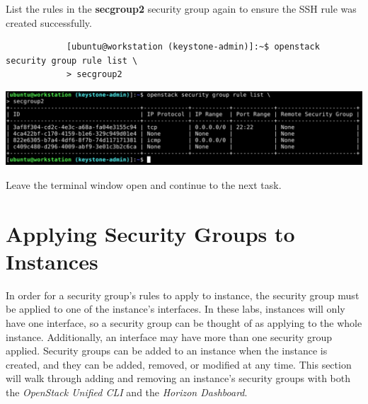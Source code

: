 \documentclass[letterpaper, 12pt]{article}
\begin{document}
\begin{enumerate}
    \begin{labstep}
        List the rules in the \textbf{secgroup2} security group again to ensure the SSH rule was created successfully.
        \begin{lstlisting}
            [ubuntu@workstation (keystone-admin)]:~$ openstack security group rule list \
            > secgroup2
        \end{lstlisting}

        \begin{center}
            \includegraphics[width=\linewidth]{images/part1/step22.png}
        \end{center}
    \end{labstep}

    \begin{labstep}
        Leave the terminal window open and continue to the next task.
    \end{labstep}

\end{enumerate}

\section{Applying Security Groups to Instances}\label{sec:applying-security-groups-to-instances}
In order for a security group's rules to apply to instance, the security group must be applied to one of the instance's interfaces.
In these labs, instances will only have one interface, so a security group can be thought of as applying to the whole instance.
Additionally, an interface may have more than one security group applied.
Security groups can be added to an instance when the instance is created, and they can be added, removed, or modified at any time.
This section will walk through adding and removing an instance's security groups with both the \textit{OpenStack Unified CLI} and the \textit{Horizon Dashboard}.
\end{document}
